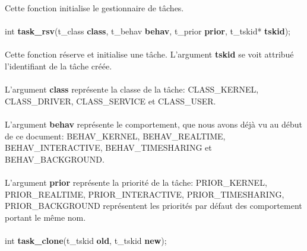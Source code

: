 \documentclass[10pt,a4wide]{article}
\begin{document}
Cette fonction initialise le gestionnaire de t\^aches.

\paragraph{}

\hspace{1.5cm}int \textbf{task\_rsv}(t\_class \textbf{class},
                                     t\_behav \textbf{behav},
                                     t\_prior \textbf{prior},
                                     t\_tskid* \textbf{tskid});

\paragraph{}

Cette fonction r\'eserve  et initialise une t\^ache. L'argument
\textbf{tskid} se voit attribu\'e l'identifiant de la t\^ache cr\'e\'ee.

\paragraph{}

L'argument \textbf{class} repr\'esente la classe de la t\^ache:
CLASS\_KERNEL, CLASS\_DRIVER, CLASS\_SERVICE et CLASS\_USER.

\paragraph{}

L'argument \textbf{behav} repr\'esente le comportement, que nous avons
d\'ej\`a vu au d\'ebut de ce document: BEHAV\_KERNEL, BEHAV\_REALTIME,
BEHAV\_INTERACTIVE, BEHAV\_TIMESHARING et BEHAV\_BACKGROUND.

\paragraph{}

L'argument \textbf{prior} repr\'esente la priorit\'e de la t\^ache:
PRIOR\_KERNEL, PRIOR\_REALTIME, PRIOR\_INTERACTIVE, PRIOR\_TIMESHARING,
PRIOR\_BACKGROUND repr\'esentent les priorit\'es par d\'efaut des
comportement portant le m\^eme nom.

\paragraph{}

\hspace{1.5cm}int \textbf{task\_clone}(t\_tskid \textbf{old},
                                       t\_tskid \textbf{new});
\end{document}
